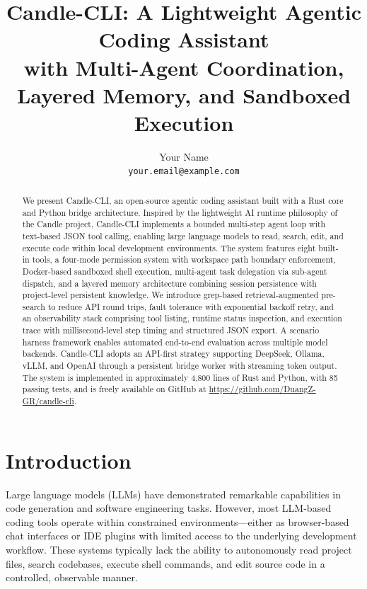 \documentclass[11pt]{article}
\title{\textbf{Candle-CLI: A Lightweight Agentic Coding Assistant}\\
\large with Multi-Agent Coordination, Layered Memory, and Sandboxed Execution}
\author{Your Name\\
\texttt{your.email@example.com}}
\date{}
\begin{document}
\maketitle

\begin{abstract}
We present Candle-CLI, an open-source agentic coding assistant built with a Rust core and Python bridge architecture. Inspired by the lightweight AI runtime philosophy of the Candle project, Candle-CLI implements a bounded multi-step agent loop with text-based JSON tool calling, enabling large language models to read, search, edit, and execute code within local development environments. The system features eight built-in tools, a four-mode permission system with workspace path boundary enforcement, Docker-based sandboxed shell execution, multi-agent task delegation via sub-agent dispatch, and a layered memory architecture combining session persistence with project-level persistent knowledge. We introduce grep-based retrieval-augmented pre-search to reduce API round trips, fault tolerance with exponential backoff retry, and an observability stack comprising tool listing, runtime status inspection, and execution trace with millisecond-level step timing and structured JSON export. A scenario harness framework enables automated end-to-end evaluation across multiple model backends. Candle-CLI adopts an API-first strategy supporting DeepSeek, Ollama, vLLM, and OpenAI through a persistent bridge worker with streaming token output. The system is implemented in approximately 4,800 lines of Rust and Python, with 85 passing tests, and is freely available on GitHub at \url{https://github.com/DuangZ-GR/candle-cli}.
\end{abstract}

\section{Introduction}

Large language models (LLMs) have demonstrated remarkable capabilities in code generation and software engineering tasks. However, most LLM-based coding tools operate within constrained environments---either as browser-based chat interfaces or IDE plugins with limited access to the underlying development workflow. These systems typically lack the ability to autonomously read project files, search codebases, execute shell commands, and edit source code in a controlled, observable manner.
\end{document}
